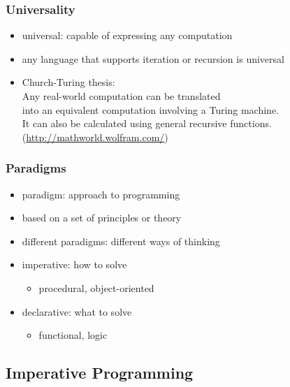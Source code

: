 \documentclass[dvipsnames]{beamer}
\theoremstyle{plain}
\begin{document}
\begin{frame}
  \frametitle{Universality}

  \begin{itemize}
    \item \alert{universal}: capable of expressing any computation
    \item any language that supports iteration or recursion is universal

    \pause
    \bigskip
    \item \alert{Church-Turing thesis}:\\
    \smallskip
    Any real-world computation can be translated\\
    into an equivalent computation involving a Turing machine.\\
    \medskip
    It can also be calculated using general recursive functions.\\
    \smallskip
    (\url{http://mathworld.wolfram.com/})
  \end{itemize}
\end{frame}

\begin{frame}
  \frametitle{Paradigms}

  \begin{itemize}
    \item \alert{paradigm}: approach to programming
    \item based on a set of principles or theory
    \item different paradigms: different ways of thinking

    \pause
    \bigskip
    \item \alert{imperative}: how to solve
    \begin{itemize}
      \item procedural, object-oriented
    \end{itemize}

    \medskip
    \item \alert{declarative}: what to solve
    \begin{itemize}
      \item functional, logic
    \end{itemize}
  \end{itemize}
\end{frame}

\subsection{Imperative Programming}
\end{document}
